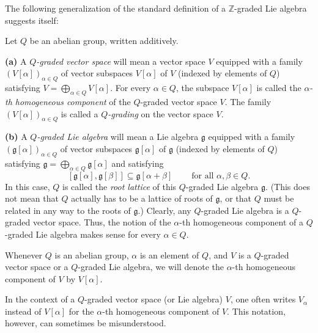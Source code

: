 \documentclass[etingof-lie.tex]{subfiles}
\begin{document}
The following generalization of the standard definition of a $\mathbb{Z}%
$-graded Lie algebra suggests itself:

\begin{definition}
\label{def.Q-graded.lie}Let $Q$ be an abelian group, written additively.

\textbf{(a)} A $Q$\textit{-graded vector space} will mean a vector space $V$
equipped with a family $\left(  V\left[  \alpha\right]  \right)  _{\alpha\in
Q}$ of vector subspaces $V\left[  \alpha\right]  $ of $V$ (indexed by elements
of $Q$) satisfying $V=\bigoplus\limits_{\alpha\in Q}V\left[  \alpha\right]  $.
For every $\alpha\in Q$, the subspace $V\left[  \alpha\right]  $ is called the
$\alpha$\textit{-th homogeneous component} of the $Q$-graded vector space $V$.
The family $\left(  V\left[  \alpha\right]  \right)  _{\alpha\in Q}$ is called
a $Q$\textit{-grading} on the vector space $V$.

\textbf{(b)} A $Q$\textit{-graded Lie algebra} will mean a Lie algebra
$\mathfrak{g}$ equipped with a family $\left(  \mathfrak{g}\left[
\alpha\right]  \right)  _{\alpha\in Q}$ of vector subspaces $\mathfrak{g}%
\left[  \alpha\right]  $ of $\mathfrak{g}$ (indexed by elements of $Q$)
satisfying $\mathfrak{g}=\bigoplus\limits_{\alpha\in Q}\mathfrak{g}\left[
\alpha\right]  $ and satisfying
\[
\left[  \mathfrak{g}\left[  \alpha\right]  ,\mathfrak{g}\left[  \beta\right]
\right]  \subseteq\mathfrak{g}\left[  \alpha+\beta\right]
\ \ \ \ \ \ \ \ \ \ \text{for all }\alpha,\beta\in Q\text{.}%
\]
In this case, $Q$ is called the \textit{root lattice} of this $Q$-graded Lie
algebra $\mathfrak{g}$. (This does not mean that $Q$ actually has to be a
lattice of roots of $\mathfrak{g}$, or that $Q$ must be related in any way to
the roots of $\mathfrak{g}$.) Clearly, any $Q$-graded Lie algebra is a
$Q$-graded vector space. Thus, the notion of the $\alpha$-th homogeneous
component of a $Q$-graded Lie algebra makes sense for every $\alpha\in Q$.
\end{definition}

\begin{Convention}
Whenever $Q$ is an abelian group, $\alpha$ is an element of $Q$, and $V$ is a
$Q$-graded vector space or a $Q$-graded Lie algebra, we will denote the
$\alpha$-th homogeneous component of $V$ by $V\left[  \alpha\right]  $.
\end{Convention}

In the context of a $Q$-graded vector space (or Lie algebra) $V$, one often
writes $V_{\alpha}$ instead of $V\left[  \alpha\right]  $ for the $\alpha$-th
homogeneous component of $V$. This notation, however, can sometimes be misunderstood.
\end{document}
